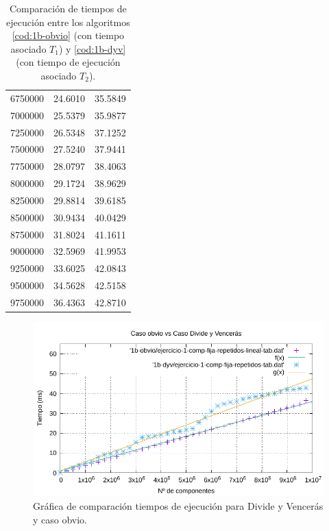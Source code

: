 \begin{table}
\begin{tabular}{|r|r|r|}
		6750000 & 24.6010 & 35.5849 \\ 
		7000000 & 25.5379 & 35.9877 \\ 
		7250000 & 26.5348 & 37.1252 \\ 
		7500000 & 27.5240 & 37.9441 \\ 
		7750000 & 28.0797 & 38.4063 \\ 
		8000000 & 29.1724 & 38.9629 \\ 
		8250000 & 29.8814 & 39.6185 \\ 
		8500000 & 30.9434 & 40.0429 \\ 
		8750000 & 31.8024 & 41.1611 \\ 
		9000000 & 32.5969 & 41.9953 \\ 
		9250000 & 33.6025 & 42.0843 \\ 
		9500000 & 34.5628 & 42.5158 \\ 
		9750000 & 36.4363 & 42.8710 \\
        \hline 
	\end{tabular}

    \caption{Comparación de tiempos de ejecución entre los algoritmos \ref{cod:1b-obvio} 
    (con tiempo asociado $T_1$) y \ref{cod:1b-dyv} (con tiempo de
    ejecución asociado $T_2$).}
    \label{tab:1b-comp}
\end{table}

\begin{figure}
    \centering
    \includegraphics[scale=0.76]{img/e1b-comp.pdf}
    \caption{Gráfica de comparación tiempos de ejecución para Divide y Vencerás y caso obvio.}
    \label{fig:1b-comp}
\end{figure}
